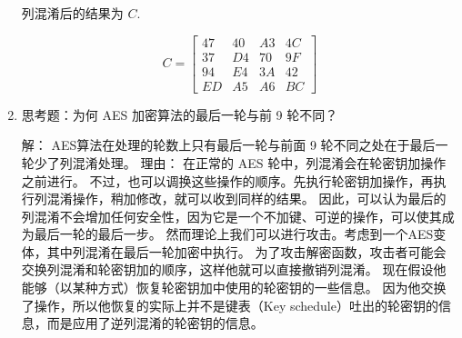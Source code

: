 \documentclass[degree=project,degree-type=project,cjk-font=noto]{thuthesis}
\begin{document}
\begin{enumerate}
列混淆后的结果为 $C$.

\begin{equation}
  C = \begin{bmatrix}
  47 & 40 & A3 & 4C \\
  37 & D4 & 70 & 9F \\
  94 & E4 & 3A & 42 \\
  ED & A5 & A6 & BC
  \end{bmatrix}
\end{equation}

\item 思考题：为何 AES 加密算法的最后一轮与前 9 轮不同？

{\heiti 解：}
\newline
AES算法在处理的轮数上只有最后一轮与前面 9 轮不同之处在于最后一轮少了列混淆处理。
理由：
\newline\newline
在正常的 AES 轮中，列混淆会在轮密钥加操作之前进行。
不过，也可以调换这些操作的顺序。先执行轮密钥加操作，再执行列混淆操作，稍加修改，就可以收到同样的结果。
因此，可以认为最后的列混淆不会增加任何安全性，因为它是一个不加键、可逆的操作，可以使其成为最后一轮的最后一步。
\newline\newline
然而理论上我们可以进行攻击。考虑到一个AES变体，其中列混淆在最后一轮加密中执行。
为了攻击解密函数，攻击者可能会交换列混淆和轮密钥加的顺序，这样他就可以直接撤销列混淆。
现在假设他能够（以某种方式）恢复轮密钥加中使用的轮密钥的一些信息。
因为他交换了操作，所以他恢复的实际上并不是键表（Key schedule）吐出的轮密钥的信息，而是应用了逆列混淆的轮密钥的信息。
\end{enumerate}
\end{document}
